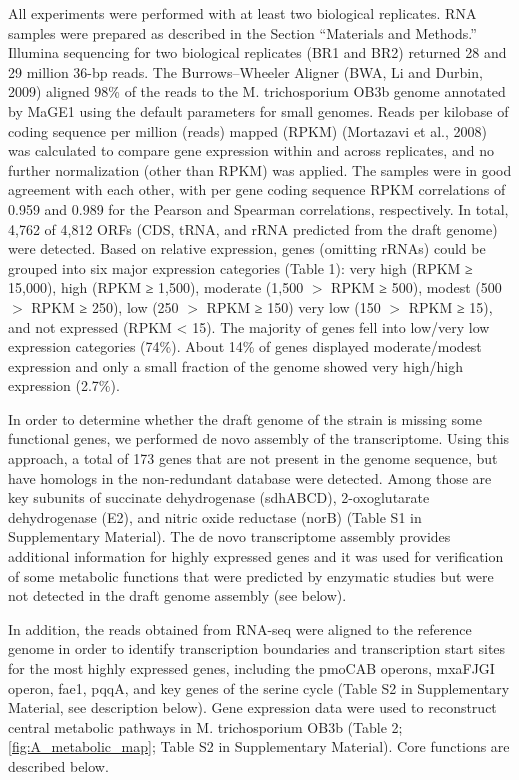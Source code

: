 All experiments were performed with at least two biological replicates.
RNA samples were prepared as described in the Section “Materials and Methods.”
Illumina sequencing for two biological replicates (BR1 and BR2) returned 28 and 29 million 36-bp reads.
The Burrows–Wheeler Aligner (BWA, Li and Durbin, 2009) aligned 98\% of the reads to the M. trichosporium OB3b genome annotated by MaGE1 using the default parameters for small genomes.
Reads per kilobase of coding sequence per million (reads) mapped (RPKM) (Mortazavi et al., 2008) was calculated to compare gene expression within and across replicates, and no further normalization (other than RPKM) was applied.
The samples were in good agreement with each other, with per gene coding sequence RPKM correlations of 0.959 and 0.989 for the Pearson and Spearman correlations, respectively.
In total, 4,762 of 4,812 ORFs (CDS, tRNA, and rRNA predicted from the draft genome) were detected.
Based on relative expression, genes (omitting rRNAs) could be grouped into six major expression categories (Table 1): very high (RPKM ≥ 15,000), high (RPKM ≥ 1,500), moderate (1,500 $>$ RPKM ≥ 500), modest (500 $>$ RPKM ≥ 250), low (250 $>$ RPKM ≥ 150) very low (150 $>$ RPKM ≥ 15), and not expressed (RPKM < 15).
The majority of genes fell into low/very low expression categories (74\%).
About 14\% of genes displayed moderate/modest expression and only a small fraction of the genome showed very high/high expression (2.7\%).


In order to determine whether the draft genome of the strain is missing some functional genes, we performed de novo assembly of the transcriptome.
Using this approach, a total of 173 genes that are not present in the genome sequence, but have homologs in the non-redundant database were detected.
Among those are key subunits of succinate dehydrogenase (sdhABCD), 2-oxoglutarate dehydrogenase (E2), and nitric oxide reductase (norB) (Table S1 in Supplementary Material).
The de novo transcriptome assembly provides additional information for highly expressed genes and it was used for verification of some metabolic functions that were predicted by enzymatic studies but were not detected in the draft genome assembly (see below).

In addition, the reads obtained from RNA-seq were aligned to the reference genome in order to identify transcription boundaries and transcription start sites for the most highly expressed genes, including the pmoCAB operons, mxaFJGI operon, fae1, pqqA, and key genes of the serine cycle (Table S2 in Supplementary Material, see description below).
Gene expression data were used to reconstruct central metabolic pathways in M. trichosporium OB3b (Table 2; \ref{fig:A_metabolic_map}; Table S2 in Supplementary Material).
Core functions are described below.


